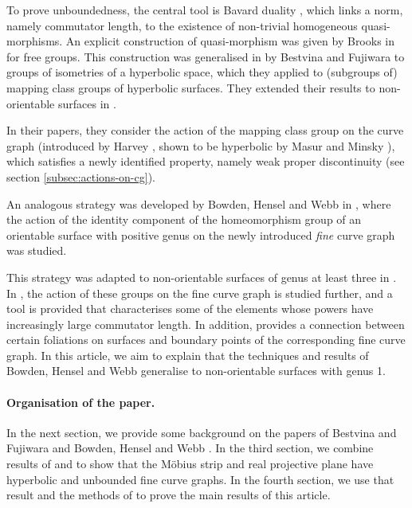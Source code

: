 \documentclass[a4paper]{article}
\begin{document}
To prove unboundedness, the central tool is Bavard duality \cite{bavard}, which links a norm, namely commutator length, to the existence of non-trivial homogeneous quasi-morphisms.
An explicit construction of quasi-morphism was given by Brooks in \cite{Brooks} for free groups.
This construction was generalised in \cite{Bestvina} by Bestvina and Fujiwara to groups of isometries of a hyperbolic space, which they applied to (subgroups of) mapping class groups of hyperbolic surfaces.
They extended their results to non-orientable surfaces in \cite{Bestvina-refinement}.

In their papers, they consider the action of the mapping class group on the curve graph (introduced by Harvey \cite{Harvey}, shown to be hyperbolic by Masur and Minsky \cite{masur-minsky}), which satisfies a newly identified property, namely weak proper discontinuity (see section \ref{subsec:actions-on-cg}).

An analogous strategy was developed by Bowden, Hensel and Webb in \cite{BHW1}, where the action of the identity component of the homeomorphism group of an orientable surface with positive genus on the newly introduced \emph{fine} curve graph was studied.

This strategy was adapted to non-orientable surfaces of genus at least three in \cite{kimura-kuno-qms}.
In \cite{BHW2}, the action of these groups on the fine curve graph is studied further, and a tool is provided that characterises some of the elements whose powers have increasingly large commutator length.
In addition, \cite{BHW2} provides a connection between certain foliations on surfaces and boundary points of the corresponding fine curve graph.
In this article, we aim to explain that the techniques and results of Bowden, Hensel and Webb generalise to non-orientable surfaces with genus 1.

\paragraph{Organisation of the paper.}
In the next section, we provide some background on the papers of Bestvina and Fujiwara \cite{Bestvina} \cite{Bestvina-refinement} and Bowden, Hensel and Webb \cite{BHW1} \cite{BHW2}.
In the third section, we combine results of \cite{kuno-hyperbolicity} and \cite{BHW1} to show that the Möbius strip and real projective plane have hyperbolic and unbounded fine curve graphs.
In the fourth section, we use that result and the methods of \cite{BHW2} to prove the main results of this article.
\end{document}
